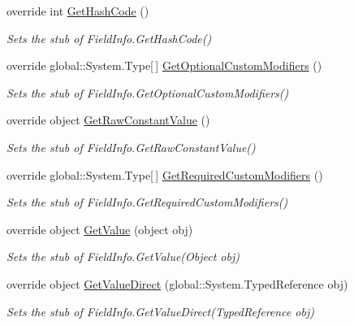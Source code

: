 \begin{DoxyCompactItemize}
override int \hyperlink{class_system_1_1_reflection_1_1_fakes_1_1_stub_field_info_ae927ffbf285e908fffc7319b08ec402b}{Get\-Hash\-Code} ()
\begin{DoxyCompactList}\small\item\em Sets the stub of Field\-Info.\-Get\-Hash\-Code()\end{DoxyCompactList}\item 
override global\-::\-System.\-Type\mbox{[}$\,$\mbox{]} \hyperlink{class_system_1_1_reflection_1_1_fakes_1_1_stub_field_info_a4ccb4fbd938148499885786d953f2395}{Get\-Optional\-Custom\-Modifiers} ()
\begin{DoxyCompactList}\small\item\em Sets the stub of Field\-Info.\-Get\-Optional\-Custom\-Modifiers()\end{DoxyCompactList}\item 
override object \hyperlink{class_system_1_1_reflection_1_1_fakes_1_1_stub_field_info_a32036b6583134e279953b56f234fa495}{Get\-Raw\-Constant\-Value} ()
\begin{DoxyCompactList}\small\item\em Sets the stub of Field\-Info.\-Get\-Raw\-Constant\-Value()\end{DoxyCompactList}\item 
override global\-::\-System.\-Type\mbox{[}$\,$\mbox{]} \hyperlink{class_system_1_1_reflection_1_1_fakes_1_1_stub_field_info_a3586c5b5647bf08609b1f51cee69c15b}{Get\-Required\-Custom\-Modifiers} ()
\begin{DoxyCompactList}\small\item\em Sets the stub of Field\-Info.\-Get\-Required\-Custom\-Modifiers()\end{DoxyCompactList}\item 
override object \hyperlink{class_system_1_1_reflection_1_1_fakes_1_1_stub_field_info_a1f1e9c6cdb13520b0372d55860bc2c6f}{Get\-Value} (object obj)
\begin{DoxyCompactList}\small\item\em Sets the stub of Field\-Info.\-Get\-Value(\-Object obj)\end{DoxyCompactList}\item 
override object \hyperlink{class_system_1_1_reflection_1_1_fakes_1_1_stub_field_info_a530031a4b15b49793c32e3883f47b76a}{Get\-Value\-Direct} (global\-::\-System.\-Typed\-Reference obj)
\begin{DoxyCompactList}\small\item\em Sets the stub of Field\-Info.\-Get\-Value\-Direct(\-Typed\-Reference obj)\end{DoxyCompactList}\item 

\end{DoxyCompactItemize}
